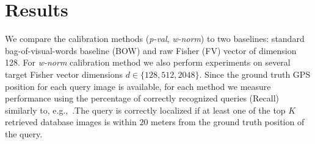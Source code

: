 





   \section{Results}

  We compare the calibration methods (\emph{p-val}, \emph{w-norm}) to two baselines: standard bag-of-visual-words baseline (BOW) and raw Fisher (FV) vector of dimension 128. For \emph{w-norm} calibration method we also perform experiments on several target Fisher vector dimensions $d\in\{128,512,2048\}$. Since the ground truth GPS position for each query image is available, for each method we measure performance using the percentage of correctly recognized queries (Recall) similarly to, e.g.,~\cite{Chen11,Knopp2010,Sattler-BMVC12}.The query is correctly localized if at least one of the top $K$ retrieved database images is within $20$ meters from the ground truth position of the query. 

